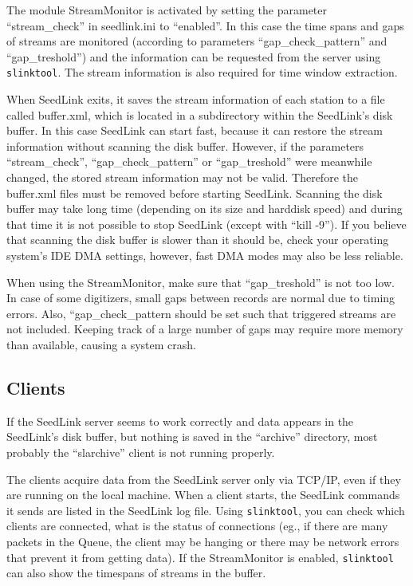 \documentclass[11pt,a4paper,titlepage]{article}
\begin{document}
The module StreamMonitor is activated by setting the parameter
``stream\_check'' in seedlink.ini to ``enabled''. In this case the time
spans and gaps of streams are monitored (according to parameters
``gap\_check\_pattern'' and ``gap\_treshold'') and the information can be
requested from the server using \verb+slinktool+. The stream information is
also required for time window extraction.

When SeedLink exits, it saves the stream information of each station to a
file called buffer.xml, which is located in a subdirectory within the
SeedLink's disk buffer. In this case SeedLink can start fast, because it
can restore the stream information without scanning the disk buffer.
However, if the parameters ``stream\_check'', ``gap\_check\_pattern'' or
``gap\_treshold'' were meanwhile changed, the stored stream information may
not be valid. Therefore the buffer.xml files must be removed before
starting SeedLink. Scanning the disk buffer may take long time (depending
on its size and harddisk speed) and during that time it is not possible to
stop SeedLink (except with ``kill -9''). If you believe that scanning the
disk buffer is slower than it should be, check your operating system's IDE
DMA settings, however, fast DMA modes may also be less reliable.

When using the StreamMonitor, make sure that ``gap\_treshold'' is not too
low. In case of some digitizers, small gaps between records are normal due
to timing errors. Also, ``gap\_check\_pattern should be set such that
triggered streams are not included. Keeping track of a large number of gaps
may require more memory than available, causing a system crash.
 

\subsection{Clients}

If the SeedLink server seems to work correctly and data appears in the
SeedLink's disk buffer, but nothing is saved in the ``archive'' directory,
most probably the ``slarchive'' client is not running properly.

The clients acquire data from the SeedLink server only via TCP/IP, even if
they are running on the local machine. When a client starts, the SeedLink
commands it sends are listed in the SeedLink log file. Using
\verb+slinktool+, you can check which clients are connected, what is the
status of connections (eg., if there are many packets in the Queue, the
client may be hanging or there may be network errors that prevent it from
getting data). If the StreamMonitor is enabled, \verb+slinktool+ can also
show the timespans of streams in the buffer.
\end{document}
